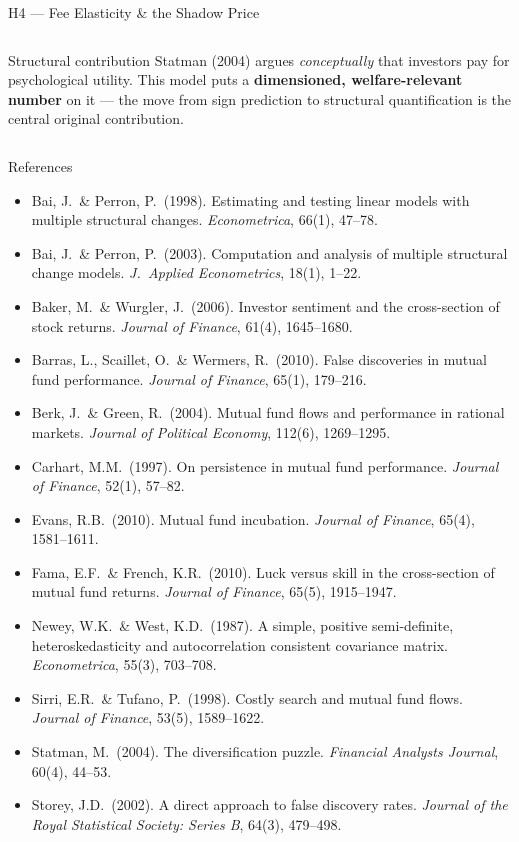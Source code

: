 \documentclass[aspectratio=169,10pt]{beamer}
\begin{document}
\begin{frame}{H4 — Fee Elasticity \& the Shadow Price}
\begin{columns}[T]
\begin{block}{Structural contribution}
{\footnotesize Statman (2004) argues \emph{conceptually} that investors pay for psychological utility. This model puts a \textbf{dimensioned, welfare-relevant number} on it — the move from sign prediction to structural quantification is the central original contribution.}
\end{block}

\end{columns}
\end{frame}
\begin{frame}[allowframebreaks]{References}
{\footnotesize
\begin{itemize}\setlength\itemsep{4pt}
  \item Bai, J.\ \& Perron, P.\ (1998). Estimating and testing linear models with multiple structural changes. \textit{Econometrica}, 66(1), 47–78.
  \item Bai, J.\ \& Perron, P.\ (2003). Computation and analysis of multiple structural change models. \textit{J.\ Applied Econometrics}, 18(1), 1–22.
  \item Baker, M.\ \& Wurgler, J.\ (2006). Investor sentiment and the cross-section of stock returns. \textit{Journal of Finance}, 61(4), 1645–1680.
  \item Barras, L., Scaillet, O.\ \& Wermers, R.\ (2010). False discoveries in mutual fund performance. \textit{Journal of Finance}, 65(1), 179–216.
  \item Berk, J.\ \& Green, R.\ (2004). Mutual fund flows and performance in rational markets. \textit{Journal of Political Economy}, 112(6), 1269–1295.
  \item Carhart, M.M.\ (1997). On persistence in mutual fund performance. \textit{Journal of Finance}, 52(1), 57–82.
  \item Evans, R.B.\ (2010). Mutual fund incubation. \textit{Journal of Finance}, 65(4), 1581–1611.
  \item Fama, E.F.\ \& French, K.R.\ (2010). Luck versus skill in the cross-section of mutual fund returns. \textit{Journal of Finance}, 65(5), 1915–1947.
  \item Newey, W.K.\ \& West, K.D.\ (1987). A simple, positive semi-definite, heteroskedasticity and autocorrelation consistent covariance matrix. \textit{Econometrica}, 55(3), 703–708.
  \item Sirri, E.R.\ \& Tufano, P.\ (1998). Costly search and mutual fund flows. \textit{Journal of Finance}, 53(5), 1589–1622.
  \item Statman, M.\ (2004). The diversification puzzle. \textit{Financial Analysts Journal}, 60(4), 44–53.
  \item Storey, J.D.\ (2002). A direct approach to false discovery rates. \textit{Journal of the Royal Statistical Society: Series B}, 64(3), 479–498.
\end{itemize}
}
\end{frame}
\end{document}
